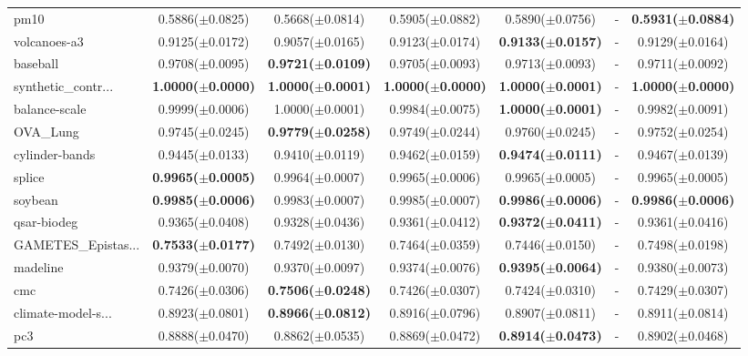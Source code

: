 \begin{longtable}{lcccccc}
pm10 & 0.5886($\pm$0.0825) & 0.5668($\pm$0.0814) & 0.5905($\pm$0.0882) & 0.5890($\pm$0.0756) & - & \textbf{0.5931($\pm$0.0884)} \\
volcanoes-a3 & 0.9125($\pm$0.0172) & 0.9057($\pm$0.0165) & 0.9123($\pm$0.0174) & \textbf{0.9133($\pm$0.0157)} & - & 0.9129($\pm$0.0164) \\
baseball & 0.9708($\pm$0.0095) & \textbf{0.9721($\pm$0.0109)} & 0.9705($\pm$0.0093) & 0.9713($\pm$0.0093) & - & 0.9711($\pm$0.0092) \\
synthetic\_contr... & \textbf{1.0000($\pm$0.0000)} & \textbf{1.0000($\pm$0.0001)} & \textbf{1.0000($\pm$0.0000)} & \textbf{1.0000($\pm$0.0001)} & - & \textbf{1.0000($\pm$0.0000)} \\
balance-scale & 0.9999($\pm$0.0006) & 1.0000($\pm$0.0001) & 0.9984($\pm$0.0075) & \textbf{1.0000($\pm$0.0001)} & - & 0.9982($\pm$0.0091) \\
OVA\_Lung & 0.9745($\pm$0.0245) & \textbf{0.9779($\pm$0.0258)} & 0.9749($\pm$0.0244) & 0.9760($\pm$0.0245) & - & 0.9752($\pm$0.0254) \\
cylinder-bands & 0.9445($\pm$0.0133) & 0.9410($\pm$0.0119) & 0.9462($\pm$0.0159) & \textbf{0.9474($\pm$0.0111)} & - & 0.9467($\pm$0.0139) \\
splice & \textbf{0.9965($\pm$0.0005)} & 0.9964($\pm$0.0007) & 0.9965($\pm$0.0006) & 0.9965($\pm$0.0005) & - & 0.9965($\pm$0.0005) \\
soybean & \textbf{0.9985($\pm$0.0006)} & 0.9983($\pm$0.0007) & 0.9985($\pm$0.0007) & \textbf{0.9986($\pm$0.0006)} & - & \textbf{0.9986($\pm$0.0006)} \\
qsar-biodeg & 0.9365($\pm$0.0408) & 0.9328($\pm$0.0436) & 0.9361($\pm$0.0412) & \textbf{0.9372($\pm$0.0411)} & - & 0.9361($\pm$0.0416) \\
GAMETES\_Epistas... & \textbf{0.7533($\pm$0.0177)} & 0.7492($\pm$0.0130) & 0.7464($\pm$0.0359) & 0.7446($\pm$0.0150) & - & 0.7498($\pm$0.0198) \\
madeline & 0.9379($\pm$0.0070) & 0.9370($\pm$0.0097) & 0.9374($\pm$0.0076) & \textbf{0.9395($\pm$0.0064)} & - & 0.9380($\pm$0.0073) \\
cmc & 0.7426($\pm$0.0306) & \textbf{0.7506($\pm$0.0248)} & 0.7426($\pm$0.0307) & 0.7424($\pm$0.0310) & - & 0.7429($\pm$0.0307) \\
climate-model-s... & 0.8923($\pm$0.0801) & \textbf{0.8966($\pm$0.0812)} & 0.8916($\pm$0.0796) & 0.8907($\pm$0.0811) & - & 0.8911($\pm$0.0814) \\
pc3 & 0.8888($\pm$0.0470) & 0.8862($\pm$0.0535) & 0.8869($\pm$0.0472) & \textbf{0.8914($\pm$0.0473)} & - & 0.8902($\pm$0.0468) \\

\end{longtable}
